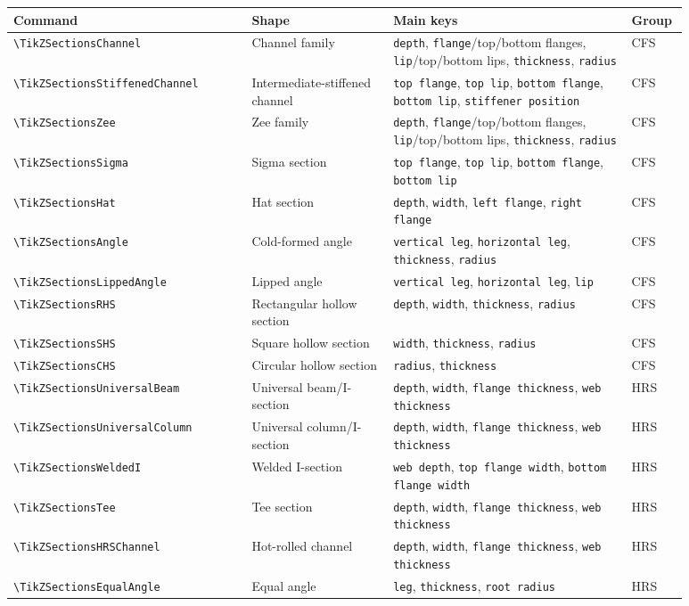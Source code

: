 \documentclass[10pt]{article}
\newcommand{\smallcommand}[1]{{\scriptsize\texttt{\textbackslash #1}}}
\newcommand{\keyname}[1]{\texttt{#1}}
\newcommand{\CommandSummary}[4]{%
  \smallcommand{#1} & #2 & #3 & #4 \\
}
\begin{document}
\begin{footnotesize}
\begin{longtable}{@{}L{0.32\linewidth}L{0.19\linewidth}L{0.32\linewidth}L{0.05\linewidth}@{}}
\toprule
Command & Shape & Main keys & Group \\
\midrule
\CommandSummary{TikZSectionsChannel}{Channel family}{\keyname{depth}, \keyname{flange}/top/bottom flanges, \keyname{lip}/top/bottom lips, \keyname{thickness}, \keyname{radius}}{CFS}
\CommandSummary{TikZSectionsStiffenedChannel}{Intermediate-stiffened channel}{\keyname{top flange}, \keyname{top lip}, \keyname{bottom flange}, \keyname{bottom lip}, \keyname{stiffener position}}{CFS}
\CommandSummary{TikZSectionsZee}{Zee family}{\keyname{depth}, \keyname{flange}/top/bottom flanges, \keyname{lip}/top/bottom lips, \keyname{thickness}, \keyname{radius}}{CFS}
\CommandSummary{TikZSectionsSigma}{Sigma section}{\keyname{top flange}, \keyname{top lip}, \keyname{bottom flange}, \keyname{bottom lip}}{CFS}
\CommandSummary{TikZSectionsHat}{Hat section}{\keyname{depth}, \keyname{width}, \keyname{left flange}, \keyname{right flange}}{CFS}
\CommandSummary{TikZSectionsAngle}{Cold-formed angle}{\keyname{vertical leg}, \keyname{horizontal leg}, \keyname{thickness}, \keyname{radius}}{CFS}
\CommandSummary{TikZSectionsLippedAngle}{Lipped angle}{\keyname{vertical leg}, \keyname{horizontal leg}, \keyname{lip}}{CFS}
\CommandSummary{TikZSectionsRHS}{Rectangular hollow section}{\keyname{depth}, \keyname{width}, \keyname{thickness}, \keyname{radius}}{CFS}
\CommandSummary{TikZSectionsSHS}{Square hollow section}{\keyname{width}, \keyname{thickness}, \keyname{radius}}{CFS}
\CommandSummary{TikZSectionsCHS}{Circular hollow section}{\keyname{radius}, \keyname{thickness}}{CFS}
\CommandSummary{TikZSectionsUniversalBeam}{Universal beam/I-section}{\keyname{depth}, \keyname{width}, \keyname{flange thickness}, \keyname{web thickness}}{HRS}
\CommandSummary{TikZSectionsUniversalColumn}{Universal column/I-section}{\keyname{depth}, \keyname{width}, \keyname{flange thickness}, \keyname{web thickness}}{HRS}
\CommandSummary{TikZSectionsWeldedI}{Welded I-section}{\keyname{web depth}, \keyname{top flange width}, \keyname{bottom flange width}}{HRS}
\CommandSummary{TikZSectionsTee}{Tee section}{\keyname{depth}, \keyname{width}, \keyname{flange thickness}, \keyname{web thickness}}{HRS}
\CommandSummary{TikZSectionsHRSChannel}{Hot-rolled channel}{\keyname{depth}, \keyname{width}, \keyname{flange thickness}, \keyname{web thickness}}{HRS}
\CommandSummary{TikZSectionsEqualAngle}{Equal angle}{\keyname{leg}, \keyname{thickness}, \keyname{root radius}}{HRS}

\end{longtable}
\end{footnotesize}
\end{document}

